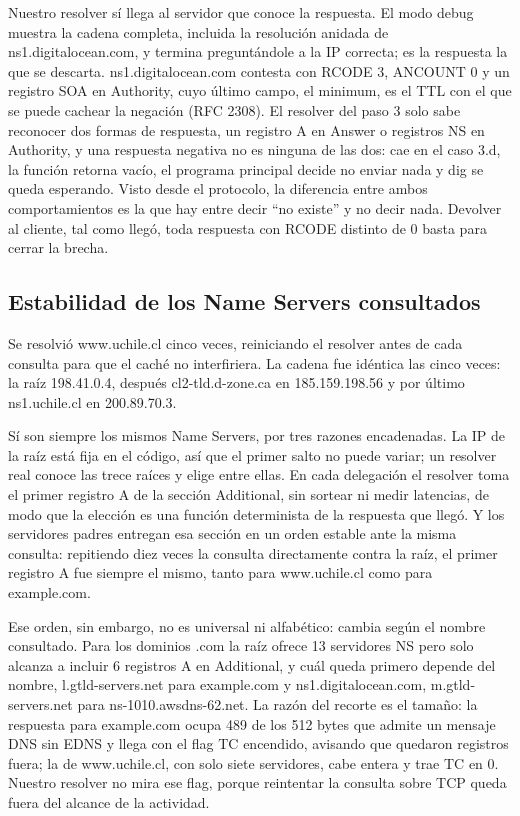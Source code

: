 \documentclass[
	spanish, %
	letterpaper, oneside
]{article}
\begin{document}
Nuestro resolver sí llega al servidor que conoce la respuesta. El modo debug muestra la cadena completa, incluida la resolución anidada de ns1.digitalocean.com, y termina preguntándole a la IP correcta; es la respuesta la que se descarta. ns1.digitalocean.com contesta con RCODE 3, ANCOUNT 0 y un registro SOA en Authority, cuyo último campo, el minimum, es el TTL con el que se puede cachear la negación (RFC 2308). El resolver del paso 3 solo sabe reconocer dos formas de respuesta, un registro A en Answer o registros NS en Authority, y una respuesta negativa no es ninguna de las dos: cae en el caso 3.d, la función retorna vacío, el programa principal decide no enviar nada y dig se queda esperando. Visto desde el protocolo, la diferencia entre ambos comportamientos es la que hay entre decir ``no existe'' y no decir nada. Devolver al cliente, tal como llegó, toda respuesta con RCODE distinto de 0 basta para cerrar la brecha.

\subsection{Estabilidad de los Name Servers consultados}
Se resolvió www.uchile.cl cinco veces, reiniciando el resolver antes de cada consulta para que el caché no interfiriera. La cadena fue idéntica las cinco veces: la raíz 198.41.0.4, después cl2-tld.d-zone.ca en 185.159.198.56 y por último ns1.uchile.cl en 200.89.70.3.

Sí son siempre los mismos Name Servers, por tres razones encadenadas. La IP de la raíz está fija en el código, así que el primer salto no puede variar; un resolver real conoce las trece raíces y elige entre ellas. En cada delegación el resolver toma el primer registro A de la sección Additional, sin sortear ni medir latencias, de modo que la elección es una función determinista de la respuesta que llegó. Y los servidores padres entregan esa sección en un orden estable ante la misma consulta: repitiendo diez veces la consulta directamente contra la raíz, el primer registro A fue siempre el mismo, tanto para www.uchile.cl como para example.com.

Ese orden, sin embargo, no es universal ni alfabético: cambia según el nombre consultado. Para los dominios .com la raíz ofrece 13 servidores NS pero solo alcanza a incluir 6 registros A en Additional, y cuál queda primero depende del nombre, l.gtld-servers.net para example.com y ns1.digitalocean.com, m.gtld-servers.net para ns-1010.awsdns-62.net. La razón del recorte es el tamaño: la respuesta para example.com ocupa 489 de los 512 bytes que admite un mensaje DNS sin EDNS y llega con el flag TC encendido, avisando que quedaron registros fuera; la de www.uchile.cl, con solo siete servidores, cabe entera y trae TC en 0. Nuestro resolver no mira ese flag, porque reintentar la consulta sobre TCP queda fuera del alcance de la actividad.
\end{document}
